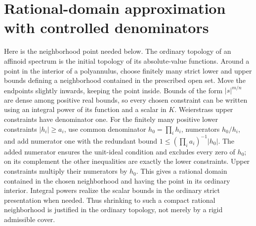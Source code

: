 \documentclass[11pt]{article}
\begin{document}
\section{Rational-domain approximation with controlled denominators}
Here is the neighborhood point needed below. The ordinary topology of
an affinoid spectrum is the initial topology of its absolute-value
functions. Around a point in the interior of a polyannulus, choose
finitely many strict lower and upper bounds defining a neighborhood
contained in the prescribed open set. Move the endpoints slightly
inwards, keeping the point inside. Bounds of the form $|s|^{m/n}$ are
dense among positive real bounds, so every chosen constraint can be
written using an integral power of its function and a scalar in $K$.
Weierstrass upper constraints have denominator one. For the finitely
many positive lower constraints $|h_i|\ge a_i$, use common denominator
$h_0=\prod_i h_i$, numerators $h_0/h_i$, and add numerator one with
the redundant bound $1\le(\prod_i a_i)^{-1}|h_0|$. The added numerator
ensures the unit-ideal condition and excludes every zero of $h_0$;
on its complement the other inequalities are exactly the lower
constraints. Upper constraints multiply their numerators by $h_0$.
This gives a rational domain contained in the chosen neighborhood and
having the point in its ordinary interior. Integral powers realize
the scalar bounds in the ordinary strict presentation when needed.
Thus shrinking to such a compact rational neighborhood is justified
in the ordinary topology, not merely by a rigid admissible cover.
\end{document}
